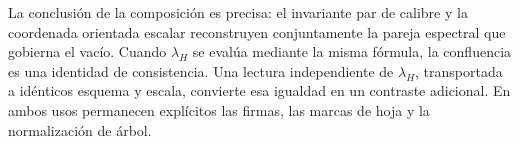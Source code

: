 La conclusión de la composición es precisa: el invariante par de calibre
y la coordenada orientada escalar reconstruyen conjuntamente la pareja
espectral que gobierna el vacío. Cuando $\lambda_H$ se evalúa mediante la
misma fórmula, la confluencia es una identidad de consistencia. Una lectura
independiente de $\lambda_H$, transportada a idénticos esquema y escala,
convierte esa igualdad en un contraste adicional. En ambos usos permanecen
explícitos las firmas, las marcas de hoja y la normalización de árbol.
